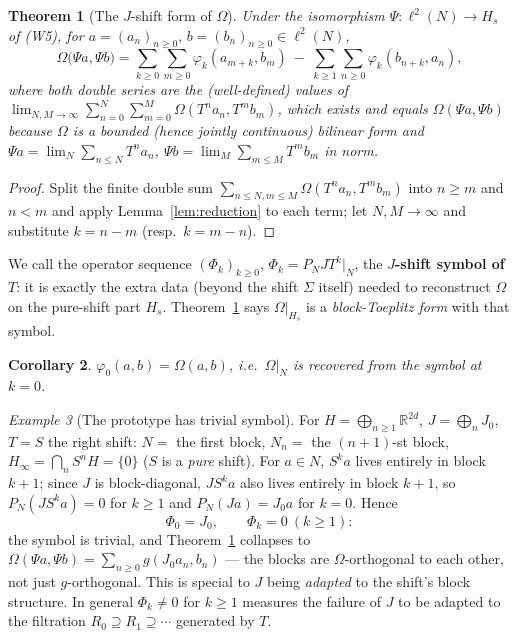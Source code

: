\documentclass[11pt,a4paper]{article}
\newtheorem{theorem}{Theorem}[section]
\newtheorem{corollary}[theorem]{Corollary}
\theoremstyle{definition}
\theoremstyle{remark}
\newtheorem{example}[theorem]{Example}
\newcommand{\R}{\mathbb{R}}
\newcommand{\cJ}{J}
\newcommand{\Om}{\Omega}
\begin{document}
\begin{theorem}[The $J$-shift form of $\Om$]
\label{thm:B}
Under the isomorphism $\Psi:\ell^2(N)\to H_s$ of (W5), for
$a=(a_n)_{n\ge0},\,b=(b_n)_{n\ge0}\in\ell^2(N)$,
\[
\Om\big(\Psi a,\Psi b\big)=\sum_{k\ge0}\sum_{m\ge0}\varphi_k(a_{m+k},b_m)\ -\
\sum_{k\ge1}\sum_{n\ge0}\varphi_k(b_{n+k},a_n),
\]
where both double series are the (well-defined) values of
$\lim_{N,M\to\infty}\sum_{n=0}^{N}\sum_{m=0}^{M}\Om(T^na_n,T^mb_m)$, which exists and equals
$\Om(\Psi a,\Psi b)$ because $\Om$ is a bounded (hence jointly continuous) bilinear form and
$\Psi a=\lim_N\sum_{n\le N}T^na_n$, $\Psi b=\lim_M\sum_{m\le M}T^mb_m$ in norm.
\end{theorem}
\begin{proof}
Split the finite double sum $\sum_{n\le N,m\le M}\Om(T^na_n,T^mb_m)$ into $n\ge m$ and $n<m$
and apply Lemma~\ref{lem:reduction} to each term; let $N,M\to\infty$ and substitute
$k=n-m$ (resp.\ $k=m-n$).
\end{proof}

We call the operator sequence $(\Phi_k)_{k\ge0}$, $\Phi_k=P_N\cJ T^k|_N$, the
\textbf{$J$-shift symbol of $T$}: it is exactly the extra data (beyond the shift $\Sigma$
itself) needed to reconstruct $\Om$ on the pure-shift part $H_s$. Theorem~\ref{thm:B} says
$\Om|_{H_s}$ is a \emph{block-Toeplitz form} with that symbol.

\begin{corollary}
$\varphi_0(a,b)=\Om(a,b)$, i.e.\ $\Om|_N$ is recovered from the symbol at $k=0$.
\end{corollary}

\begin{example}[The prototype has trivial symbol]
For $H=\bigoplus_{n\ge1}\R^{2d}$, $\cJ=\bigoplus_nJ_0$, $T=S$ the right shift: $N=$ the
first block, $N_n=$ the $(n{+}1)$-st block, $H_\infty=\bigcap_nS^nH=\{0\}$ ($S$ is a
\emph{pure} shift). For $a\in N$, $S^{k}a$ lives entirely in block $k+1$; since $\cJ$ is
block-diagonal, $\cJ S^{k}a$ also lives entirely in block $k+1$, so $P_N(\cJ S^ka)=0$ for
$k\ge1$ and $P_N(\cJ a)=J_0a$ for $k=0$. Hence
\[
\Phi_0=J_0,\qquad \Phi_k=0\ (k\ge1):
\]
the symbol is trivial, and Theorem~\ref{thm:B} collapses to
$\Om(\Psi a,\Psi b)=\sum_{n\ge0}g(J_0a_n,b_n)$ --- the blocks are $\Om$-orthogonal to each
other, not just $g$-orthogonal. This is special to $\cJ$ being \emph{adapted} to the shift's
block structure. In general $\Phi_k\ne0$ for $k\ge1$ measures the failure of $\cJ$ to be
adapted to the filtration $R_0\supseteq R_1\supseteq\cdots$ generated by $T$.
\end{example}
\end{document}
